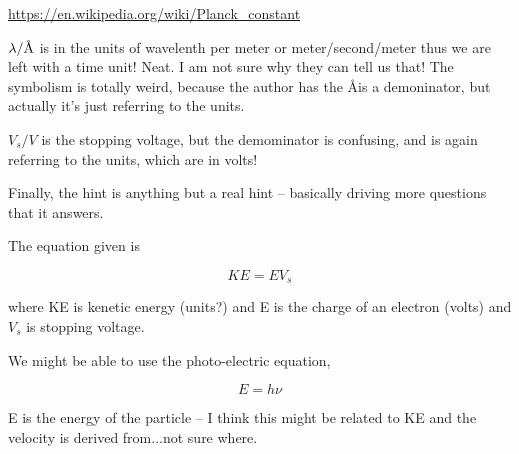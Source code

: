 \documentclass{article}
\newcommand{\angstrom}{\textup{\AA}}
\begin{document}
\url{https://en.wikipedia.org/wiki/Planck_constant}



$\lambda/\angstrom$ is in the units of wavelenth per meter or meter/second/meter thus we are left with a time unit! Neat. I am not sure why they can tell us that!  The symbolism is totally weird, because the author has the \angstrom is a demoninator, but actually it's just referring to the units. 

$V_s/V$ is the stopping voltage, but the demominator is confusing, and is again referring to the units, which are in volts!

Finally, the hint is anything but a real hint -- basically driving more questions that it answers. 

The equation given is 

\begin{equation}
KE = EV_s
\end{equation}

\noindent where KE is kenetic energy (units?) and E is the charge of an electron (volts) and $V_s$ is stopping voltage.

We might be able to use the photo-electric equation,

\begin{equation}
E = h\nu
\end{equation}

\noindent E is the energy of the particle -- I think this might be related to KE and the velocity is derived from...not sure where.
\end{document}
